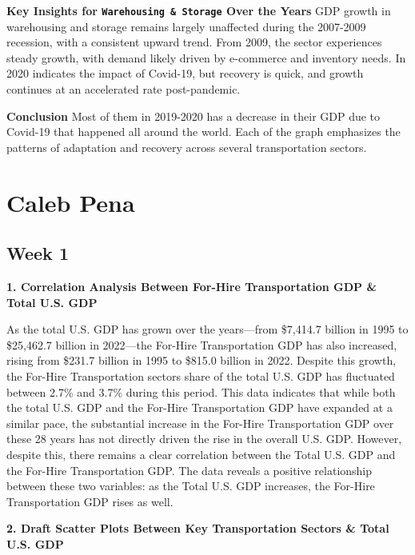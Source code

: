 \documentclass[
  letterpaper,
  DIV=11,
  numbers=noendperiod]{scrreprt}
\begin{document}
\textbf{Key Insights for \texttt{Warehousing\ \&\ Storage} Over the
Years} GDP growth in warehousing and storage remains largely unaffected
during the 2007-2009 recession, with a consistent upward trend. From
2009, the sector experiences steady growth, with demand likely driven by
e-commerce and inventory needs. In 2020 indicates the impact of
Covid-19, but recovery is quick, and growth continues at an accelerated
rate post-pandemic.

\textbf{Conclusion} Most of them in 2019-2020 has a decrease in their
GDP due to Covid-19 that happened all around the world. Each of the
graph emphasizes the patterns of adaptation and recovery across several
transportation sectors.

\chapter{Caleb Pena}\label{caleb-pena-1}

\section{Week 1}\label{week-1-10}

\textbf{1. Correlation Analysis Between For-Hire Transportation GDP \&
Total U.S. GDP}

As the total U.S. GDP has grown over the years---from \$7,414.7 billion
in 1995 to \$25,462.7 billion in 2022---the For-Hire Transportation GDP
has also increased, rising from \$231.7 billion in 1995 to \$815.0
billion in 2022. Despite this growth, the For-Hire Transportation
sectors share of the total U.S. GDP has fluctuated between 2.7\% and
3.7\% during this period. This data indicates that while both the total
U.S. GDP and the For-Hire Transportation GDP have expanded at a similar
pace, the substantial increase in the For-Hire Transportation GDP over
these 28 years has not directly driven the rise in the overall U.S. GDP.
However, despite this, there remains a clear correlation between the
Total U.S. GDP and the For-Hire Transportation GDP. The data reveals a
positive relationship between these two variables: as the Total U.S. GDP
increases, the For-Hire Transportation GDP rises as well.

\textbf{2. Draft Scatter Plots Between Key Transportation Sectors \&
Total U.S. GDP}
\end{document}

